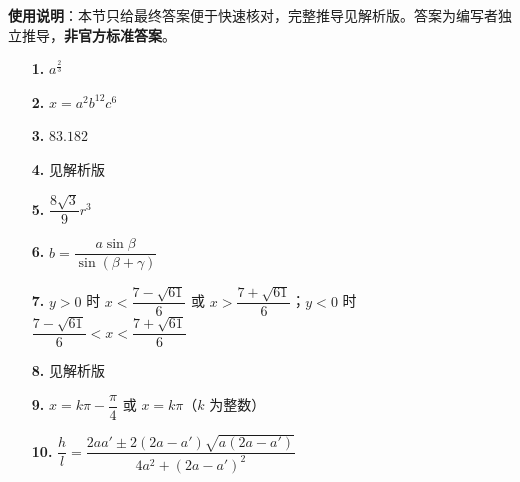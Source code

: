 
\begin{gknotice}
\textbf{使用说明}：本节只给最终答案便于快速核对，完整推导见解析版。答案为编写者独立推导，\textbf{非官方标准答案}。
\end{gknotice}

\begin{itemize}[leftmargin=2.6em]
  \item[\textbf{1.}] $a^{\frac23}$
  \item[\textbf{2.}] $x=a^2b^{12}c^6$
  \item[\textbf{3.}] $83.182$
  \item[\textbf{4.}] 见解析版
  \item[\textbf{5.}] $\dfrac{8\sqrt3}{9}r^3$
  \item[\textbf{6.}] $b=\dfrac{a\sin\beta}{\sin(\beta+\gamma)}$
\end{itemize}

\begin{itemize}[leftmargin=2.6em]
  \item[\textbf{7.}] $y>0$ 时 $x<\dfrac{7-\sqrt{61}}6$ 或 $x>\dfrac{7+\sqrt{61}}6$；$y<0$ 时 $\dfrac{7-\sqrt{61}}6<x<\dfrac{7+\sqrt{61}}6$
  \item[\textbf{8.}] 见解析版
  \item[\textbf{9.}] $x=k\pi-\dfrac\pi4$ 或 $x=k\pi$（$k$ 为整数）
  \item[\textbf{10.}] $\dfrac hl=\dfrac{2aa'\pm2(2a-a')\sqrt{a(2a-a')}}{4a^2+(2a-a')^2}$
\end{itemize}
